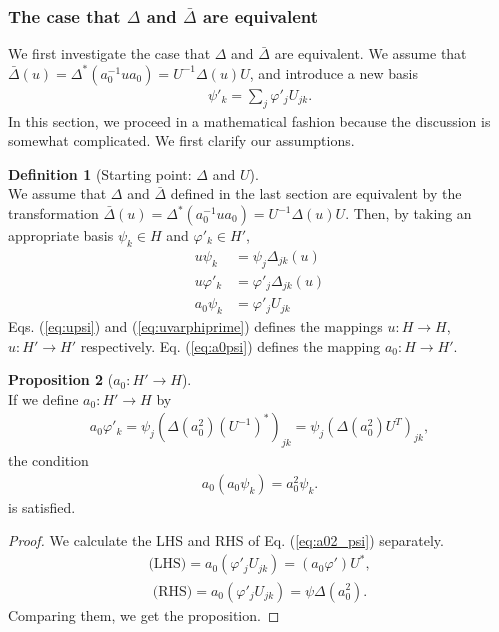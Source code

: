 \documentclass{article}
\theoremstyle{definition}
\newtheorem{dfn}{Definition}[section]
\newtheorem{prop}[dfn]{Proposition}
\begin{document}
\subsubsection{The case that $\Delta$ and $\bar{\Delta}$ are equivalent}
We first investigate the case that $\Delta$ and $\bar{\Delta}$ are equivalent.
We assume that $\bar{\Delta}(u) = \Delta^*(a_0^{-1} u a_0) = U^{-1} \Delta(u) U$, and introduce a new basis
\begin{align}
  \psi'_k = \sum_j \varphi'_j U_{jk}.
\end{align}
In this section, we proceed in a mathematical fashion because the discussion is somewhat complicated.
We first clarify our assumptions.
\begin{dfn}[Starting point: $\Delta$ and $U$]\label{dfn:starting_point}~\\
  We assume that $\Delta$ and $\bar{\Delta}$ defined in the last section are equivalent by the transformation $\bar{\Delta}(u) = \Delta^*(a_0^{-1} u a_0) = U^{-1} \Delta(u) U$.
  Then, by taking an appropriate basis  $\psi_k \in H$ and $\varphi'_k \in H'$,
\begin{align}
  u \psi_k &= \psi_j \Delta_{jk} (u)
  \label{eq:upsi}
  \\
  u \varphi'_k &= \varphi'_j \Delta_{jk}(u)
  \label{eq:uvarphiprime}
  \\
  a_0 \psi_k &= \varphi'_j U_{jk}
  \label{eq:a0psi}
\end{align}
Eqs. (\ref{eq:upsi}) and (\ref{eq:uvarphiprime}) defines the mappings $u: H \to H$, $u: H' \to H'$ respectively.
Eq. (\ref{eq:a0psi}) defines the mapping $a_0: H\to H'$.
\end{dfn}

\begin{prop}[$a_0 : H' \to H$]\label{prop:a_0Hprime_H}~\\
  If we define $a_0 : H' \to H$ by 
  \begin{align}
    a_0 \varphi'_k = \psi_j (\Delta (a_0^2) (U^{-1})^*)_{jk} = \psi_j (\Delta (a_0^2) U^{T})_{jk},
    \label{eq:a0varphi_prime}
  \end{align}
  the condition
  \begin{align}
    a_0(a_0 \psi_k) = a_0^2 \psi_k. 
    \label{eq:a02_psi}
  \end{align}
  is satisfied.
\end{prop}

\begin{proof}
  We calculate the LHS and RHS of Eq. (\ref{eq:a02_psi}) separately.
  \begin{align}
    \text{(LHS)} = a_0 (\varphi'_j U_{jk}) = (a_0 \varphi') U^*,
  \end{align}
  \begin{align}
    \text{(RHS)} = a_0 (\varphi'_j U_{jk}) = \psi \Delta(a_0^2).
  \end{align}
  Comparing them, we get the proposition.
\end{proof}
\end{document}

